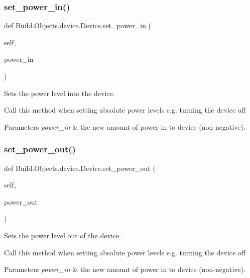 \subsubsection{\texorpdfstring{set\+\_\+power\+\_\+in()}{set\_power\_in()}}
{\footnotesize\ttfamily def Build.\+Objects.\+device.\+Device.\+set\+\_\+power\+\_\+in (\begin{DoxyParamCaption}\item[{}]{self,  }\item[{}]{power\+\_\+in }\end{DoxyParamCaption})}



Sets the power level into the device. 

Call this method when setting absolute power levels e.\+g. turning the device off


\begin{DoxyParams}{Parameters}
{\em power\+\_\+in} & the new amount of power in to device (non-\/negative). \\
\hline
\end{DoxyParams}
\mbox{\label{class_build_1_1_objects_1_1device_1_1_device_a75d4f47040d95f6e5adb6238cf9e2463}} 
\subsubsection{\texorpdfstring{set\+\_\+power\+\_\+out()}{set\_power\_out()}}
{\footnotesize\ttfamily def Build.\+Objects.\+device.\+Device.\+set\+\_\+power\+\_\+out (\begin{DoxyParamCaption}\item[{}]{self,  }\item[{}]{power\+\_\+out }\end{DoxyParamCaption})}



Sets the power level out of the device. 

Call this method when setting absolute power levels e.\+g. turning the device off


\begin{DoxyParams}{Parameters}
{\em power\+\_\+in} & the new amount of power in to device (non-\/negative). \\
\hline
\end{DoxyParams}
\mbox{\label{class_build_1_1_objects_1_1device_1_1_device_a06ffd25b07e6361e4ecb1e3432cff477}} 
